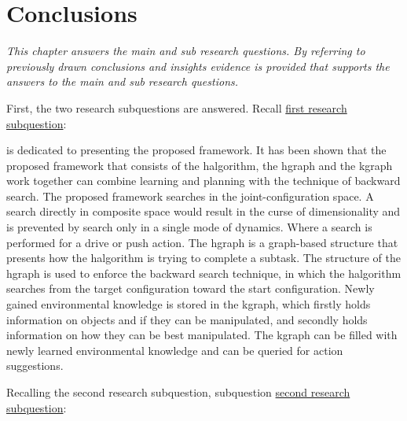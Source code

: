 \chapter{Conclusions}%
\label{chap:conclusion}
\textit{This chapter answers the main and sub research questions. By referring to previously drawn conclusions and insights evidence is provided that supports the answers to the main and sub research questions.\bs}

First, the two research subquestions are answered. Recall \hyperref[researchsubquestion:does_it_work]{first research subquestion}:\vspace{0.5\baselineskip}\\
\textit{\vspace{0.5\baselineskip}}\bs

 is dedicated to presenting the proposed framework. It has been shown that the proposed framework that consists of the \ac{halgorithm}, the \ac{hgraph} and the \ac{kgraph} work together can combine learning and planning with the technique of backward search. The proposed framework searches in the joint-configuration space. A search directly in composite space would result in the curse of dimensionality and is prevented by search only in a single mode of dynamics. Where a search is performed for a drive or push action. The \ac{hgraph} is a graph-based structure that presents how the \ac{halgorithm} is trying to complete a subtask. The structure of the \ac{hgraph} is used to enforce the backward search technique, in which the \ac{halgorithm} searches from the target configuration toward the start configuration. Newly gained environmental knowledge is stored in the \ac{kgraph}, which firstly holds information on objects and if they can be manipulated, and secondly holds information on how they can be best manipulated. The \ac{kgraph} can be filled with newly learned environmental knowledge and can be queried for action suggestions.\bs

Recalling the second research subquestion, subquestion \hyperref[researchsubquestion:does_it_compare]{second research subquestion}:\vspace{0.5\baselineskip}\\
\textit{}\vspace{0.5\baselineskip}\bs



